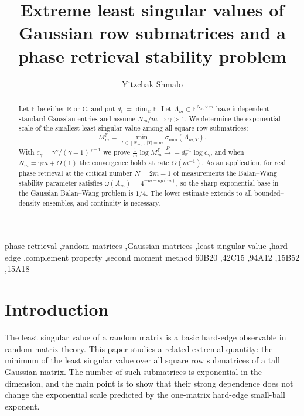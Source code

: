 \documentclass[preprint,12pt]{elsarticle}
\newcommand{\R}{\mathbb{R}}
\newcommand{\C}{\mathbb{C}}
\newcommand{\F}{\mathbb{F}}
\begin{document}
\begin{frontmatter}

\title{Extreme least singular values of Gaussian row submatrices and a phase retrieval stability problem}

\author[huji]{Yitzchak Shmalo}
\address[huji]{Einstein Institute of Mathematics, The Hebrew University of Jerusalem, Givat Ram, Jerusalem, Israel}

\begin{abstract}
Let $\F$ be either $\R$ or $\C$, and put $d_\F=\dim_\R\F$. Let $A_m\in\F^{N_m\times m}$ have independent
standard Gaussian entries and assume $N_m/m\to\gamma>1$. We determine the exponential scale of the
smallest least singular value among all square row submatrices:
\[
  M_m^\F=\min_{T\subset [N_m],\, |T|=m}\sigma_{\min}(A_{m,T}).
\]
With $c_\gamma=\gamma^\gamma/(\gamma-1)^{\gamma-1}$ we prove
$\tfrac1m\log M_m^\F\xrightarrow{P}-d_\F^{-1}\log c_\gamma$, and when $N_m=\gamma m+O(1)$ the convergence
holds at rate $O(m^{-1})$. As an application, for real
phase retrieval at the critical number $N=2m-1$ of measurements the Balan--Wang stability parameter
satisfies $\omega(A_m)=4^{-m+o_P(m)}$, so the sharp exponential base in the Gaussian Balan--Wang problem
is $1/4$. The lower estimate extends to all bounded--density ensembles, and continuity is necessary.
\end{abstract}

\begin{keyword}
phase retrieval \sep random matrices \sep Gaussian matrices \sep least singular value \sep hard edge \sep complement property \sep second moment method
\MSC[2020] 60B20 \sep 42C15 \sep 94A12 \sep 15B52 \sep 15A18
\end{keyword}

\end{frontmatter}

\section{Introduction}

The least singular value of a random matrix is a basic hard-edge observable in random matrix theory.
This paper studies a related extremal quantity: the minimum of the least singular value over all
square row submatrices of a tall Gaussian matrix. The number of such submatrices is exponential in
the dimension, and the main point is to show that their strong dependence does not change the
exponential scale predicted by the one-matrix hard-edge small-ball exponent.
\end{document}
